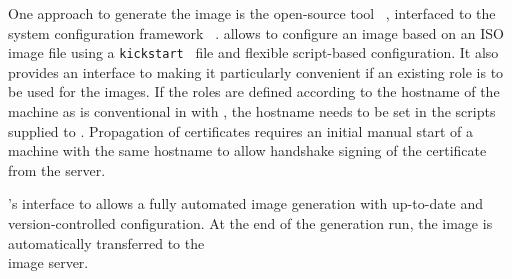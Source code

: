 
One approach to generate the image is the open-source tool
\Packer~\cite{packer}, interfaced to the system configuration framework \Puppet~\cite{puppet}.
\Packer allows to configure an image based on an ISO image file using a \texttt{kickstart}~\cite{kickstart} file and flexible script-based configuration. 
It also provides an interface to \Puppet making it particularly convenient if an existing \Puppet role is to be used for the images. If the roles are defined according to the hostname of the machine as is conventional in \Puppet with \Hieradata, the hostname needs to be set in the scripts supplied to \Packer. Propagation of certificates requires an initial manual start of a machine with the same hostname to allow handshake signing of the certificate from the \Puppet server.

\Packer's interface to \Puppet allows a fully automated image generation with up-to-date and version-controlled configuration. At the end of the generation run, the image is automatically transferred to the \\\Openstack image server.




